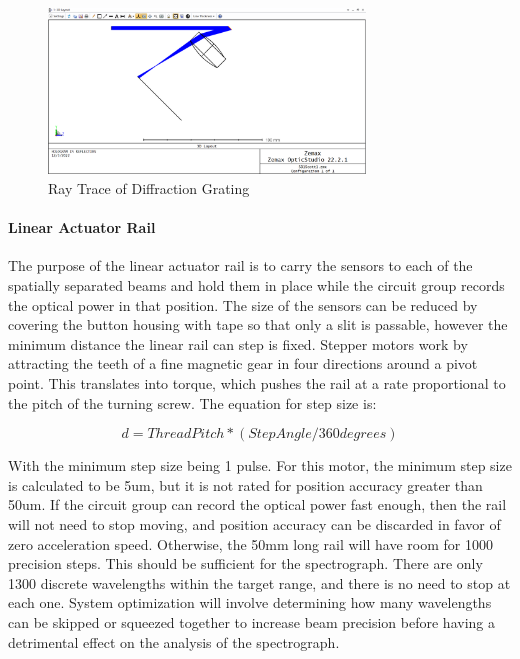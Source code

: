 \begin{figure}[H]
    \caption{Ray Trace of Diffraction Grating}
    \centering
    \includegraphics[width=0.75\textwidth]{images/Zemax Ray Trace.png}
\end{figure}

\paragraph{Linear Actuator Rail} The purpose of the linear actuator rail is to carry the sensors to each of the spatially separated beams and hold them in place while the circuit group records the optical power in that position. The size of the sensors can be reduced by covering the button housing with tape so that only a slit is passable, however the minimum distance the linear rail can step is fixed. Stepper motors work by attracting the teeth of a fine magnetic gear in four directions around a pivot point. This translates into torque, which pushes the rail at a rate proportional to the pitch of the turning screw. The equation for step size is:

\begin{equation}
    d = Thread Pitch * (Step Angle / 360 degrees)
\end{equation}

With the minimum step size being 1 pulse. For this motor, the minimum step size is calculated to be 5um, but it is not rated for position accuracy greater than 50um. If the circuit group can record the optical power fast enough, then the rail will not need to stop moving, and position accuracy can be discarded in favor of zero acceleration speed. Otherwise, the 50mm long rail will have room for 1000 precision steps. This should be sufficient for the spectrograph. There are only 1300 discrete wavelengths within the target range, and there is no need to stop at each one. System optimization will involve determining how many wavelengths can be skipped or squeezed together to increase beam precision before having a detrimental effect on the analysis of the spectrograph.


